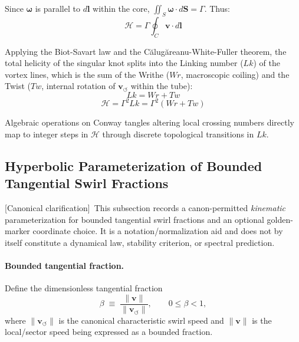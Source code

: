 \documentclass[10pt]{article}
\newcommand{\statusCanonical}{\textsf{[Canonical clarification]}}
\begin{document}
        Since $\boldsymbol{\omega}$ is parallel to $d\mathbf{l}$ within the core, $\iint_S \boldsymbol{\omega} \cdot d\mathbf{S} = \Gamma$. Thus:
        \begin{equation}
            \mathcal{H} = \Gamma \oint_{C} \mathbf{v} \cdot d\mathbf{l}
        \end{equation}

        Applying the Biot-Savart law and the C\u{a}lug\u{a}reanu-White-Fuller theorem, the total helicity of the singular knot splits into the Linking number ($Lk$) of the vortex lines, which is the sum of the Writhe ($Wr$, macroscopic coiling) and the Twist ($Tw$, internal rotation of $\mathbf{v}_{\!\boldsymbol{\circlearrowleft}}$ within the tube):
        \begin{equation}
            Lk = Wr + Tw
        \end{equation}
        \begin{equation}
            \mathcal{H} = \Gamma^2 Lk = \Gamma^2 (Wr + Tw)
        \end{equation}

        Algebraic operations on Conway tangles altering local crossing numbers directly map to integer steps in $\mathcal{H}$ through discrete topological transitions in $Lk$.


    \subsection{Hyperbolic Parameterization of Bounded Tangential Swirl Fractions}
    \label{app:golden_hyperbolic_parameterization}

    \statusCanonical\ This subsection records a canon-permitted \emph{kinematic}
    parameterization for bounded tangential swirl fractions and an optional
    golden-marker coordinate choice. It is a notation/normalization aid and
    does not by itself constitute a dynamical law, stability criterion, or
    spectral prediction.

    \paragraph{Bounded tangential fraction.}
    Define the dimensionless tangential fraction
    \begin{equation}
        \beta \;\equiv\; \frac{\lVert \mathbf{v} \rVert}{\lVert \mathbf{v}_{\!\boldsymbol{\circlearrowleft}} \rVert},
        \qquad 0 \le \beta < 1,
    \end{equation}
    where $\lVert \mathbf{v}_{\!\boldsymbol{\circlearrowleft}} \rVert$ is the canonical
    characteristic swirl speed and $\lVert \mathbf{v} \rVert$ is the local/sector speed
    being expressed as a bounded fraction.
\end{document}
